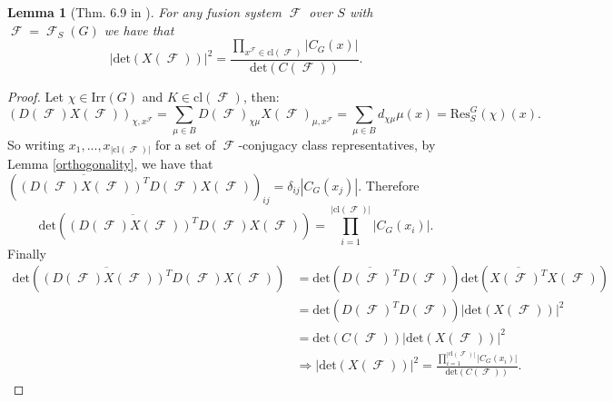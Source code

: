 \documentclass[12pt]{article}
\DeclareMathOperator{\sF}{\mathcal{F}}
\theoremstyle{plain}
\newtheorem{lem}[thm]{Lemma}
\theoremstyle{definition}
\begin{document}
\begin{lem}[Thm. 6.9 in \cite{olsson}]\label{det fraction} 
For any fusion system $\sF$ over $S$ with $\sF = \sF_S(G)$ we have that 
\[\displaystyle|\mathrm{det}(X(\sF))|^2 = \frac{\prod_{x^{\sF} \in \text{cl}(\sF)} |C_G(x)|}{\mathrm{det}(C(\sF))}.\]
\end{lem}
\begin{proof}
Let $\chi \in \mathrm{Irr}(G)$ and $K \in \text{cl}(\sF)$, then:
\[(D(\sF)X(\sF))_{\chi, x^{\sF}} = \sum_{\mu \in B} D(\sF)_{\chi\mu}X(\sF)_{\mu, x^{\sF}} = \sum_{\mu \in B} d_{\chi \mu}\mu(x) = \text{Res}_S^G(\chi)(x).\]
So writing $x_1, ..., x_{|\text{cl}(\sF)|}$ for a set of $\sF$-conjugacy class representatives, by Lemma \ref{orthogonality}, we have that $(\overline{(D(\sF)X(\sF))^T}D(\sF)X(\sF))_{ij} = \delta_{ij}|C_G(x_{j})|$. Therefore \[\mathrm{det}(\overline{(D(\sF)X(\sF))^T}D(\sF)X(\sF)) = \prod_{i=1}^{|\text{cl}(\sF)|}|C_G(x_i)|.\] Finally 
\begin{align*}
\mathrm{det}(\overline{(D(\sF)X(\sF))^T}D(\sF)X(\sF)) &= \mathrm{det}(\overline{D(\sF)^T}D(\sF))\mathrm{det}(\overline{X(\sF)^T}X(\sF)) \\ 
&= \mathrm{det}(D(\sF)^TD(\sF))|\mathrm{det}(X(\sF))|^2 \\&=\mathrm{det}(C(\sF))|\mathrm{det}(X(\sF))|^2 \\ 
&\Rightarrow |\mathrm{det}(X(\sF))|^2 =  \frac{\prod_{i=1}^{|\text{cl}(\sF)|}|C_G(x_i)|}{\mathrm{det}(C(\sF))}.
\end{align*}
\end{proof}
\end{document}
